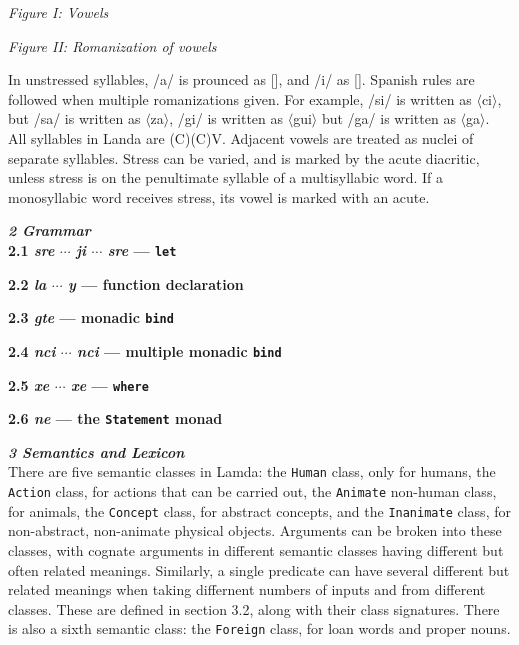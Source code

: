 \documentclass{article}[10pt]
\begin{document}
\begin{multicols}{2}
{\begin{center}
\emph{Figure I: Vowels}\\
 \Large
\begin{vowel}
\end{vowel} \end{center}}

{\begin{center}
\emph{Figure II: Romanization of vowels}\\
 \Large
\begin{vowel}
\end{vowel} \end{center}}
\end{multicols}

In unstressed syllables, /a/ is prounced as [], and /i/ as []. Spanish rules are followed when multiple romanizations given. For example, /si/ is written as $\langle$ci$\rangle$, but /sa/ is written as $\langle$za$\rangle$, /gi/ is written as $\langle$gui$\rangle$ but /ga/ is written as $\langle$ga$\rangle$. All syllables in Landa are (C)(C)V. Adjacent vowels are treated as nuclei of separate syllables. Stress can be varied, and is marked by the acute diacritic, unless stress is on the penultimate syllable of a multisyllabic word. If a monosyllabic word receives stress, its vowel is marked with an acute.

\clearpage
{\bf \emph{2 Grammar}}\\

{\bf 2.1 \emph{sre} $\cdots$ \emph{ji} $\cdots$ \emph{sre} --- \texttt{let}}

{\bf 2.2 \emph{la} $\cdots$ \emph{y} --- function declaration}

{\bf 2.3 \emph{gte} --- monadic \texttt{bind}}
 
{\bf 2.4 \emph{nci} $\cdots$ \emph{nci} --- multiple monadic \texttt{bind}}

{\bf 2.5 \emph{xe} $\cdots$ \emph{xe} --- \texttt{where}}

{\bf 2.6 \emph{ne} --- the \texttt{Statement} monad}

\clearpage
{\bf \emph{3 Semantics and Lexicon}}\\

There are five semantic classes in Lamda: the \texttt{Human} class, only for humans, the \texttt{Action} class, for actions that can be carried out, the \texttt{Animate} non-human class, for animals, the \texttt{Concept} class, for abstract concepts, and the \texttt{Inanimate} class, for non-abstract, non-animate physical objects. Arguments can be broken into these classes, with cognate arguments in different semantic classes having different but often related meanings. Similarly, a single predicate can have several different but related meanings when taking differnent numbers of inputs and from different classes. These are defined in section 3.2, along with their class signatures. There is also a sixth semantic class: the \texttt{Foreign} class, for loan words and proper nouns.\\
\end{document}
